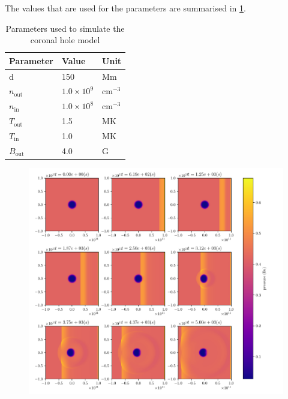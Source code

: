 \documentclass[a4paper]{article}
\begin{document}
The values that are used for the parameters are summarised in \cref{tab:coronal_hole}.
\begin{table}[H]
    \centering
    \caption{Parameters used to simulate the coronal hole model}
    \label{tab:coronal_hole}
    \begin{tabular}{|l|l|l|}
    \hline
    \textbf{Parameter}             & \textbf{Value}                                  & \textbf{Unit}              \\ \hline
    d                              & 150                                             & Mm                         \\ \hline
    $n_\text{out}$ & $1.0 \times 10^9$ & $\text{cm}^{-3}$ \\ \hline
    $n_\text{in}$                              & $1.0 \times 10^8$                                               & $\text{cm}^{-3}$                          \\ \hline
    $T_\text{out}$                              & 1.5                                               & MK                          \\ \hline
    $T_\text{in}$                              & 1.0                                               & MK                          \\ \hline
    $B_\text{out}$                              & 4.0                                               & G                          \\ \hline
\end{tabular}
\end{table}
\begin{figure}[h]
	\centering
	\includegraphics[width=1\textwidth]{figures/hole_time.pdf}
	\caption{}
	\label{fig:figures-hole}
\end{figure}
\end{document}
